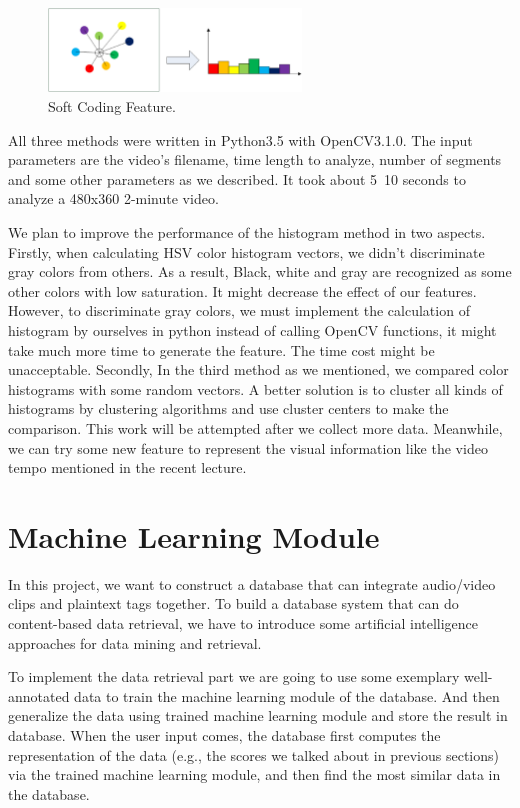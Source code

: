 \documentclass{report}
\begin{document}
\begin{figure}[htb]
\centering
\includegraphics[width=0.6\textwidth]{coding.eps}
\caption{Soft Coding Feature.}
\end{figure}

All three methods were written in Python3.5 with OpenCV3.1.0. The input parameters are the video's filename, time length to analyze, number of segments and some other parameters as we described. It took about 5~10 seconds to analyze a 480x360 2-minute video.

We plan to improve the performance of the histogram method in two aspects. Firstly, when calculating HSV color histogram vectors, we didn't discriminate gray colors from others. As a result, Black, white and gray are recognized as some other colors with low saturation. It might decrease the effect of our features. However, to discriminate gray colors, we must implement the calculation of histogram by ourselves in python instead of calling OpenCV functions, it might take much more time to generate the feature. The time cost might be unacceptable. Secondly, In the third method as we mentioned, we compared color histograms with some random vectors. A better solution is to cluster all kinds of histograms by clustering algorithms and use cluster centers to make the comparison. This work will be attempted after we collect more data. Meanwhile, we can try some new feature to represent the visual information like the video tempo mentioned in the recent lecture.

\section{Machine Learning Module}

In this project, we want to construct a database that can integrate audio/video clips and plaintext tags together. To build a database system that can do content-based data retrieval, we have to introduce some artificial intelligence approaches for data mining and retrieval.

To implement the data retrieval part we are going to use some exemplary well-annotated data to train the machine learning module of the database. And then generalize the data using trained machine learning module and store the result in database. When the user input comes, the database first computes the representation of the data (e.g., the scores we talked about in previous sections) via the trained machine learning module, and then find the most similar data in the database.
\end{document}
